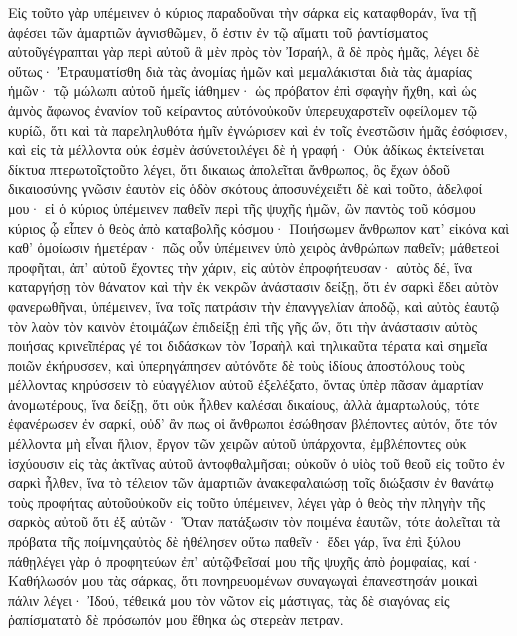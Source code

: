 Εἰς τοῦτο γὰρ υπέμεινεν ὁ κύριος παραδοῦναι τὴν σάρκα εἰς καταφθοράν, ἵνα τῇ ἀφέσει τῶν ἁμαρτιῶν ἁγνισθῶμεν, ὅ ἐστιν ἐν τῷ αἵματι τοῦ ῥαντίσματος αὐτοῦγέγραπται γὰρ περὶ αὐτοῦ ἃ μὲν πρὸς τὸν Ἰσραήλ, ἃ δὲ πρὸς ἡμᾶς, λέγει δὲ οὕτως· Ἐτραυματίσθη διὰ τὰς ἀνομίας ἡμῶν καὶ μεμαλάκισται διὰ τὰς ἁμαρίας ἡμῶν· τῷ μώλωπι αὐτοῦ ἡμεῖς ἰάθημεν· ὡς πρόβατον ἐπὶ σφαγὴν ἤχθη, καὶ ὡς ἀμνὸς ἄφωνος ἐνανίον τοῦ κείραντος αὐτόνοὐκοῦν ὑπερευχαρστεῖν οφείλομεν τῷ κυρίῶ, ὅτι καὶ τὰ παρεληλυθότα ἡμῖν ἐγνώρισεν καὶ ἐν τοῖς ἐνεστῶσιν ἡμᾶς ἐσόφισεν, καὶ εἰς τὰ μέλλοντα οὐκ ἐσμὲν ἀσύνετοιλέγει δὲ ἡ γραφή· Οὐκ ἀδίκως ἐκτείνεται δίκτυα πτερωτοῖςτοῦτο λέγει, ὅτι δικαιως ἀπολεῖται ἄνθρωπος, ὃς ἔχων ὁδοῦ δικαιοσύνης γνῶσιν ἑαυτὸν εἰς ὁδὸν σκότους ἀποσυνέχειἔτι δὲ καὶ τοῦτο, ἀδελφοί μου· εἰ ὁ κύριος ὑπέμεινεν παθεῖν περὶ τῆς ψυχῆς ἡμῶν, ὢν παντὸς τοῦ κόσμου κύριος ᾧ εἶπεν ὁ θεὸς ἀπὸ καταβολῆς κόσμου· Ποιήσωμεν ἄνθρωπον κατ’ εἰκόνα καὶ καθ’ ὁμοίωσιν ἡμετέραν· πῶς οὖν ὑπέμεινεν ὑπὸ χειρὸς ἀνθρώπων παθεῖν; μάθετεοἱ προφῆται, ἀπ’ αὐτοῦ ἔχοντες τὴν χάριν, εἰς αὐτὸν ἐπροφήτευσαν· αὐτὸς δέ, ἵνα καταργήσῃ τὸν θάνατον καὶ τὴν ἐκ νεκρῶν ἀνάστασιν δείξῃ, ὅτι ἐν σαρκὶ ἔδει αὐτὸν φανερωθῆναι, ὑπέμεινεν, ἵνα τοῖς πατράσιν τὴν ἐπανγγελίαν ἀποδῷ, καὶ αὐτὸς ἑαυτῷ τὸν λαὸν τὸν καινὸν ἑτοιμάζων ἐπιδείξῃ ἐπὶ τῆς γῆς ὤν, ὅτι τὴν ἀνάστασιν αὐτὸς ποιήσας κρινεῖπέρας γέ τοι διδάσκων τὸν Ἰσραὴλ καὶ τηλικαῦτα τέρατα καὶ σημεῖα ποιῶν ἐκήρυσσεν, καὶ ὑπερηγάπησεν αὐτόνὅτε δὲ τοὺς ἰδίους ἀποστόλους τοὺς μέλλοντας κηρύσσειν τὸ εὐαγγέλιον αὐτοῦ ἐξελέξατο, ὄντας ὑπὲρ πᾶσαν ἁμαρτίαν ἀνομωτέρους, ἵνα δείξῃ, ὅτι οὐκ ἦλθεν καλέσαι δικαίους, ἀλλὰ ἁμαρτωλούς, τότε ἐφανέρωσεν ἐν σαρκί, οὐδ’ ἂν πως οἱ ἄνθρωποι ἐσώθησαν βλέποντες αὐτόν, ὅτε τόν μέλλοντα μὴ εἶναι ἥλιον, ἔργον τῶν χειρῶν αὐτοῦ ὑπάρχοντα, ἐμβλέποντες οὐκ ἰσχύουσιν εἰς τὰς ἀκτῖνας αὐτοῦ ἀντοφθαλμῆσαι; οὐκοῦν ὁ υἱὸς τοῦ θεοῦ εἰς τοῦτο ἐν σαρκὶ ἦλθεν, ἵνα τὸ τέλειον τῶν ἁμαρτιῶν ἀνακεφαλαιώσῃ τοῖς διώξασιν ἐν θανάτῳ τοὺς προφήτας αὐτοῦοὐκοῦν εἰς τοῦτο ὑπέμεινεν, λέγει γὰρ ὁ θεὸς τὴν πληγὴν τῆς σαρκὸς αὐτοῦ ὅτι ἐξ αὐτῶν· Ὅταν πατάξωσιν τὸν ποιμένα ἑαυτῶν, τότε ἀολεῖται τὰ πρόβατα τῆς ποίμνηςαὐτὸς δὲ ἠθέλησεν οὕτω παθεῖν· ἔδει γάρ, ἵνα ἐπὶ ξύλου πάθῃλέγει γὰρ ὁ προφητεύων ἐπ’ αὐτῷΦεῖσαί μου τῆς ψυχῆς ἀπὸ ῥομφαίας, καί· Καθήλωσόν μου τὰς σάρκας, ὅτι πονηρευομένων συναγωγαὶ ἐπανεστησάν μοικαὶ πάλιν λέγει· Ἰδού, τέθεικά μου τὸν νῶτον εἰς μάστιγας, τὰς δὲ σιαγόνας εἰς ῥαπίσματατὸ δὲ πρόσωπόν μου ἔθηκα ὡς στερεὰν πετραν.
